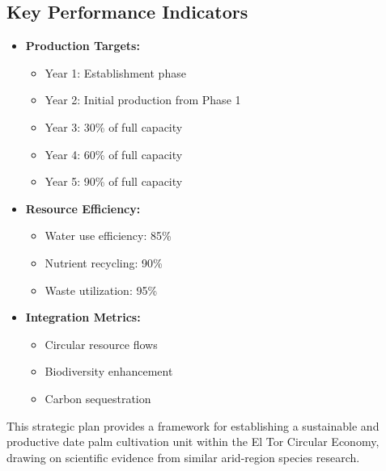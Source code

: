 \subsection{Key Performance Indicators}
\begin{itemize}
    \item \textbf{Production Targets:}
    \begin{itemize}
        \item Year 1: Establishment phase
        \item Year 2: Initial production from Phase 1
        \item Year 3: 30\% of full capacity
        \item Year 4: 60\% of full capacity
        \item Year 5: 90\% of full capacity
    \end{itemize}
    \item \textbf{Resource Efficiency:}
    \begin{itemize}
        \item Water use efficiency: 85\%
        \item Nutrient recycling: 90\%
        \item Waste utilization: 95\%
    \end{itemize}
    \item \textbf{Integration Metrics:}
    \begin{itemize}
        \item Circular resource flows
        \item Biodiversity enhancement
        \item Carbon sequestration
    \end{itemize}
\end{itemize}

This strategic plan provides a framework for establishing a sustainable and productive date palm cultivation unit within the El Tor Circular Economy, drawing on scientific evidence from similar arid-region species research.
